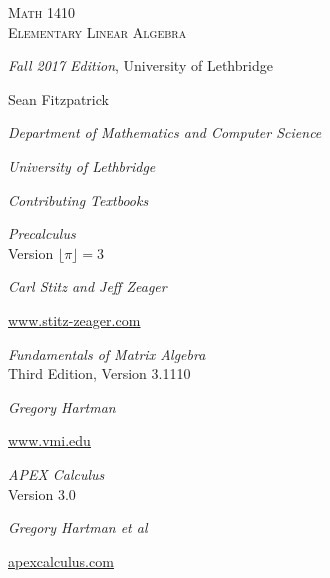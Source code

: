 
\hskip 125pt\begin{minipage}{\textwidth}
\begin{flushright}

\textsc{{\Huge Math 1410 \\
Elementary Linear Algebra}} \\

\bigskip

\textsl{\Large Fall 2017 Edition}, 
{\Large University of Lethbridge}\\


\bigskip

\Large
\vspace{1in}

Sean Fitzpatrick

\emph{\large Department of Mathematics and Computer Science}

\emph{\large University of Lethbridge}\vskip15pt

\parbox{200pt}{\textit{Contributing Textbooks}}\hskip 2cm \phantom{.}

\vspace{0.5in}

\textit{Precalculus}\\
{\large Version $\lfloor \pi\rfloor = 3$}

\emph{\large Carl Stitz and Jeff Zeager}

{\large \href{http://www.stitz-zeager.com}{\underline{www.stitz-zeager.com}}}\vskip 15pt

\textit{Fundamentals of Matrix Algebra}\\
{\large Third Edition, Version 3.1110}

\emph{\large Gregory Hartman}

{\large \href{http://www.vmi.edu/academics/departments/applied-mathematics/affordable-textbooks-apex/}{\underline{www.vmi.edu}}}\vskip 15pt

\textit{APEX Calculus}\\
{\large Version 3.0}

\emph{\large Gregory Hartman et al}

{\large \href{http://www.apexcalculus.com}{\underline{apexcalculus.com}}}\vskip 15pt


\normalsize
\end{flushright}
\end{minipage}

